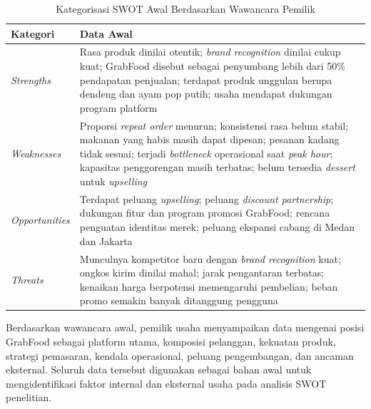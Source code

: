 \begin{table}[!htbp]
    \centering
    \caption{Kategorisasi SWOT Awal Berdasarkan Wawancara Pemilik}
    \label{tab:swot_wawancara_awal}
    \begin{tabularx}{\textwidth}{|J|Y|}
        \toprule
        \textbf{Kategori}      & \textbf{Data Awal}                                                                                                                                                                                                                                                                                           \\ \hline
        \midrule
        \textit{Strengths}     & Rasa produk dinilai otentik; \textit{brand recognition} dinilai cukup kuat; GrabFood disebut sebagai penyumbang lebih dari 50\% pendapatan penjualan; terdapat produk unggulan berupa dendeng dan ayam pop putih; usaha mendapat dukungan program platform                                                       \\ \hline
        \textit{Weaknesses}    & Proporsi \textit{repeat order} menurun; konsistensi rasa belum stabil; makanan yang habis masih dapat dipesan; pesanan kadang tidak sesuai; terjadi \textit{bottleneck} operasional saat \textit{peak hour}; kapasitas penggorengan masih terbatas; belum tersedia \textit{dessert} untuk \textit{upselling} \\ \hline
        \textit{Opportunities} & Terdapat peluang \textit{upselling}; peluang \textit{discount partnership}; dukungan fitur dan program promosi GrabFood; rencana penguatan identitas merek; peluang ekspansi cabang di Medan dan Jakarta                                                                                                     \\ \hline
        \textit{Threats}       & Munculnya kompetitor baru dengan \textit{brand recognition} kuat; ongkos kirim dinilai mahal; jarak pengantaran terbatas; kenaikan harga berpotensi memengaruhi pembelian; beban promo semakin banyak ditanggung pengguna                                                                                    \\ \hline
        \bottomrule
    \end{tabularx}
\end{table}
Berdasarkan wawancara awal, pemilik usaha menyampaikan data mengenai posisi GrabFood sebagai platform utama, komposisi pelanggan, kekuatan produk, strategi pemasaran, kendala operasional, peluang pengembangan, dan ancaman eksternal. Seluruh data tersebut digunakan sebagai bahan awal untuk mengidentifikasi faktor internal dan eksternal usaha pada analisis SWOT penelitian.

